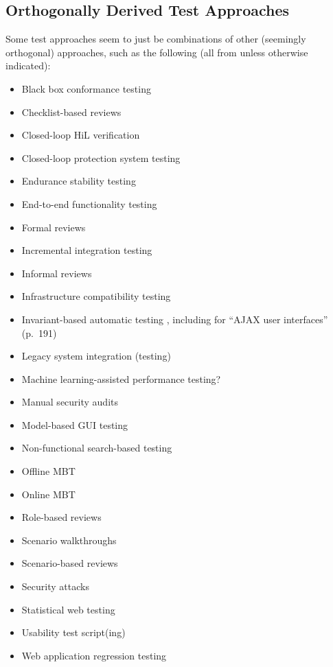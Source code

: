 \subsection{Orthogonally Derived Test Approaches}
\label{chap:testing:sec:orthogonal-tests}
Some test approaches seem to just be combinations of other (seemingly
orthogonal) approaches, such as the following (all from
 unless otherwise indicated):
\begin{itemize}
      \item Black box conformance testing \citep[p.~25]{JardEtAl1999}
      \item Checklist-based reviews
      \item Closed-loop HiL verification \citep[p.~6]{PreußeEtAl2012}
      \item Closed-loop protection system testing \citep[p.~331]{ForsythEtAl2004}
      \item Endurance stability testing \citep[p.~55]{Firesmith2015}
      \item End-to-end functionality testing \citep[Tab.~2]{Gerrard2000a}
      \item Formal reviews
      \item Incremental integration testing \citep[p.~601]{SharmaEtAl2021}
      \item Informal reviews
      \item Infrastructure compatibility testing \citep[p.~53]{Firesmith2015}
      \item Invariant-based automatic testing
            \citep[pp.~184-185,~Tab.~21]{DoğanEtAl2014}, including for
            ``AJAX user interfaces'' (p.~191)
      \item Legacy system integration (testing) \citep[Tab.~2]{Gerrard2000a}
      \item Machine learning-assisted performance testing? \citep{Moghadam2019}
      \item Manual security audits \citep[p.~28]{Gerrard2000b}
      \item Model-based GUI testing \citep[Tab.~1]{DoğanEtAl2014}
      \item Non-functional search-based testing \citep[Tab.~1]{DoğanEtAl2014}
      \item Offline MBT
      \item Online MBT
      \item Role-based reviews
      \item Scenario walkthroughs \citep[Fig.~4]{Gerrard2000a}
      \item Scenario-based reviews
      \item Security attacks
      \item Statistical web testing \citep[p.~185]{DoğanEtAl2014}
      \item Usability test script(ing)
      \item Web application regression testing \cite[Tab.~21]{DoğanEtAl2014}
\end{itemize}

